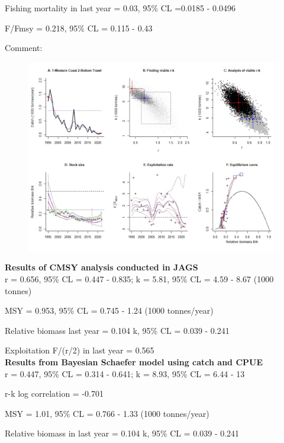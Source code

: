 \documentclass[12pt,a4paper]{article}\usepackage[]{graphicx}\usepackage[]{xcolor}
\begin{document}
Fishing mortality in last year = 0.03, 95\% CL =0.0185 - 0.0496

F/Fmsy  = 0.218, 95\% CL = 0.115 - 0.43 

 Comment:  

    \pagebreak

    \begin{figure}[ht]
    \centering
    \includegraphics[width=1.00\textwidth ext=.jpg type=jpg]{1-Western Coast 2-Bottom Trawl_AN.jpg}
    \end{figure}

    \textbf{Results of CMSY analysis conducted in JAGS}\\

r = 0.656, 95\% CL = 0.447 - 0.835; k = 5.81, 95\% CL = 4.59 - 8.67 (1000 tonnes)

MSY = 0.953, 95\% CL = 0.745 - 1.24 (1000 tonnes/year)

Relative biomass last year = 0.104 k, 95\% CL = 0.039 - 0.241

Exploitation F/(r/2) in last year = 0.565 \\

\textbf{Results from Bayesian Schaefer model using catch and CPUE}\\

r = 0.447, 95\% CL = 0.314 - 0.641; k = 8.93, 95\% CL = 6.44 - 13

r-k log correlation = -0.701

MSY = 1.01, 95\% CL = 0.766 - 1.33 (1000 tonnes/year)

Relative biomass in last year = 0.104 k, 95\% CL = 0.039 - 0.241
\end{document}
